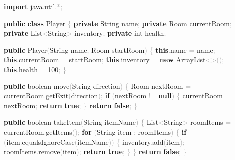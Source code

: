 \documentclass[
  justified,
  openright,
]{tufte-book}
\newcommand{\KeywordTok}[1]{\textcolor{CodeKeyword}{\textbf{#1}}}  %
\newcommand{\CodeNumTok}[1]{\textcolor{CodeNumber}{#1}}             %
\newcommand{\CodeFuncTok}[1]{\textcolor{CodeKeyword}{#1}}           %
\newcommand{\CodeTypeTok}[1]{\textcolor{CodeType}{#1}}              %
\newcommand{\CodeAccentTok}[1]{\textcolor{CodeAccent}{#1}}          %
\newcommand{\OperatorTok}[1]{\textcolor{DarkGray}{#1}}              %
\newenvironment{Shaded}{%
  \begin{mdframed}[style=TufteCode]%
}{%
  \end{mdframed}%
}
\begin{document}
\begin{Shaded}
\begin{Highlighting}[]
\KeywordTok{import} \CodeAccentTok{java}\OperatorTok{.}\CodeAccentTok{util}\OperatorTok{.*;}
 
\KeywordTok{public} \KeywordTok{class} Player \OperatorTok{\{}
    \KeywordTok{private} String name\OperatorTok{;}
    \KeywordTok{private} Room currentRoom\OperatorTok{;}
    \KeywordTok{private} List\OperatorTok{\textless{}}String\OperatorTok{\textgreater{}} inventory\OperatorTok{;}
    \KeywordTok{private} \CodeTypeTok{int} health\OperatorTok{;}
 
    \KeywordTok{public} \CodeFuncTok{Player}\OperatorTok{(}String name\OperatorTok{,} Room startRoom\OperatorTok{)} \OperatorTok{\{}
        \KeywordTok{this}\OperatorTok{.}\CodeFuncTok{name} \OperatorTok{=} name\OperatorTok{;}
        \KeywordTok{this}\OperatorTok{.}\CodeFuncTok{currentRoom} \OperatorTok{=} startRoom\OperatorTok{;}
        \KeywordTok{this}\OperatorTok{.}\CodeFuncTok{inventory} \OperatorTok{=} \KeywordTok{new} ArrayList\OperatorTok{\textless{}\textgreater{}();}
        \KeywordTok{this}\OperatorTok{.}\CodeFuncTok{health} \OperatorTok{=} \CodeNumTok{100}\OperatorTok{;}
    \OperatorTok{\}}
 
    \KeywordTok{public} \CodeTypeTok{boolean} \CodeFuncTok{move}\OperatorTok{(}String direction\OperatorTok{)} \OperatorTok{\{}
        Room nextRoom \OperatorTok{=} currentRoom\OperatorTok{.}\CodeFuncTok{getExit}\OperatorTok{(}direction\OperatorTok{);}
        \KeywordTok{if} \OperatorTok{(}nextRoom \OperatorTok{!=} \KeywordTok{null}\OperatorTok{)} \OperatorTok{\{}
            currentRoom \OperatorTok{=} nextRoom\OperatorTok{;}
            \KeywordTok{return} \KeywordTok{true}\OperatorTok{;}
        \OperatorTok{\}}
        \KeywordTok{return} \KeywordTok{false}\OperatorTok{;}
    \OperatorTok{\}}
 
    \KeywordTok{public} \CodeTypeTok{boolean} \CodeFuncTok{takeItem}\OperatorTok{(}String itemName\OperatorTok{)} \OperatorTok{\{}
        List\OperatorTok{\textless{}}String\OperatorTok{\textgreater{}} roomItems \OperatorTok{=} currentRoom\OperatorTok{.}\CodeFuncTok{getItems}\OperatorTok{();}
        \KeywordTok{for} \OperatorTok{(}String item \OperatorTok{:} roomItems\OperatorTok{)} \OperatorTok{\{}
            \KeywordTok{if} \OperatorTok{(}item\OperatorTok{.}\CodeFuncTok{equalsIgnoreCase}\OperatorTok{(}itemName\OperatorTok{))} \OperatorTok{\{}
                inventory\OperatorTok{.}\CodeFuncTok{add}\OperatorTok{(}item\OperatorTok{);}
                roomItems\OperatorTok{.}\CodeFuncTok{remove}\OperatorTok{(}item\OperatorTok{);}
                \KeywordTok{return} \KeywordTok{true}\OperatorTok{;}
            \OperatorTok{\}}
        \OperatorTok{\}}
        \KeywordTok{return} \KeywordTok{false}\OperatorTok{;}
    \OperatorTok{\}}
 

\end{Highlighting}
\end{Shaded}
\end{document}
